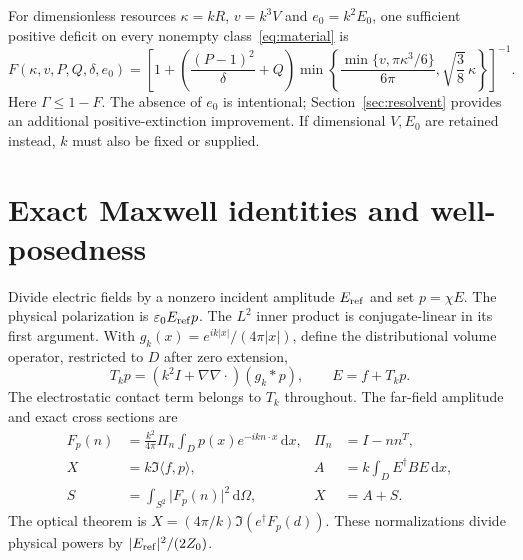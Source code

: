 \documentclass[11pt]{article}
\newcommand{\dd}{\,\mathrm{d}}
\newcommand{\ip}[2]{\langle #1,#2\rangle}
\newcommand{\abs}[1]{\lvert #1\rvert}
\begin{document}
For dimensionless resources $\kappa=kR$, $v=k^3V$ and $e_0=k^2E_0$, one sufficient positive deficit on every nonempty class~\eqref{eq:material} is
\begin{equation}\label{eq:dimensionless}
 F(\kappa,v,P,Q,\delta,e_0)=
 \left[1+\left(\frac{(P-1)^2}{\delta}+Q\right)
 \min\left\{\frac{\min\{v,\pi\kappa^3/6\}}{6\pi},
              \sqrt{\frac38}\,\kappa\right\}\right]^{-1}.
\end{equation}
Here $\Gamma\leq1-F$. The absence of $e_0$ is intentional; Section~\ref{sec:resolvent} provides an additional positive-extinction improvement. If dimensional $V,E_0$ are retained instead, $k$ must also be fixed or supplied.

\section{Exact Maxwell identities and well-posedness}\label{sec:maxwell}
Divide electric fields by a nonzero incident amplitude $E_{\rm ref}$ and set $p=\chi E$. The physical polarization is $\varepsilon_0E_{\rm ref}p$. The $L^2$ inner product is conjugate-linear in its first argument. With $g_k(x)=e^{ik\abs x}/(4\pi\abs x)$, define the distributional volume operator, restricted to $D$ after zero extension,
\begin{equation}\label{eq:volume}
 T_kp=(k^2I+\nabla\nabla\cdot)(g_k*p),\qquad E=f+T_kp.
\end{equation}
The electrostatic contact term belongs to $T_k$ throughout. The far-field amplitude and exact cross sections are
\begin{align}
 F_p(n)&=\frac{k^2}{4\pi}\Pi_n\int_Dp(x)e^{-ikn\cdot x}\dd x,
 &\Pi_n&=I-nn^T,\label{eq:far}\\
 X&=k\Im\ip f p,
 &A&=k\int_DE^\dagger BE\dd x,\label{eq:powers}\\
 S&=\int_{S^2}\abs{F_p(n)}^2\dd\Omega,
 &X&=A+S.\label{eq:energy}
\end{align}
The optical theorem is $X=(4\pi/k)\Im(e^\dagger F_p(d))$. These normalizations divide physical powers by $\abs{E_{\rm ref}}^2/(2Z_0)$.
\end{document}
